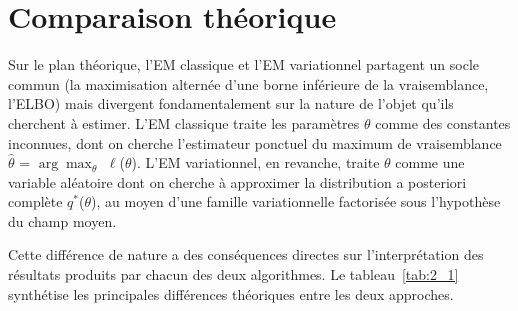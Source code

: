 \section{Comparaison théorique}\label{sec:comparaison_theorique}
Sur le plan théorique, l'EM classique et l'EM variationnel partagent un socle commun (la maximisation alternée d'une borne inférieure de la vraisemblance, l'ELBO) mais divergent fondamentalement sur la nature de l'objet qu'ils cherchent à estimer. L'EM classique traite les paramètres $\theta $ comme des constantes inconnues, dont on cherche l'estimateur ponctuel du maximum de vraisemblance $\hat{\theta }$ = $\arg\max_{\theta}$ $\ell $($\theta $). L'EM variationnel, en revanche, traite $\theta $ comme une variable aléatoire dont on cherche à approximer la distribution a posteriori complète $q^{*}$($\theta $), au moyen d'une famille variationnelle factorisée sous l'hypothèse du champ moyen.

Cette différence de nature a des conséquences directes sur l'interprétation des résultats produits par chacun des deux algorithmes. Le tableau~\ref{tab:2_1} synthétise les principales différences théoriques entre les deux approches.

